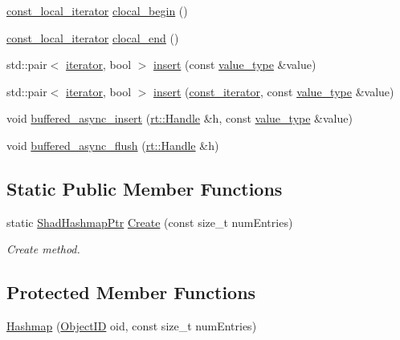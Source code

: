 \begin{DoxyCompactItemize}
\item 
\hyperlink{classshad_1_1Hashmap_afdf2dad495223a7d8bcec4256b591d89}{const\-\_\-local\-\_\-iterator} \hyperlink{classshad_1_1Hashmap_a04a14f79c423b6bef9fba77f642be9b6}{clocal\-\_\-begin} ()
\item 
\hyperlink{classshad_1_1Hashmap_afdf2dad495223a7d8bcec4256b591d89}{const\-\_\-local\-\_\-iterator} \hyperlink{classshad_1_1Hashmap_a41013ec16375b3de1af140c8f2e54627}{clocal\-\_\-end} ()
\item 
std\-::pair$<$ \hyperlink{classshad_1_1Hashmap_a2500b369fd011d6a9d5e98ff213c9c66}{iterator}, bool $>$ \hyperlink{classshad_1_1Hashmap_ab49d3f791ad9ba7af13349b2ae1a273f}{insert} (const \hyperlink{classshad_1_1Hashmap_ad8c0108347b59bcd19ccb8070a313dd8}{value\-\_\-type} \&value)
\item 
std\-::pair$<$ \hyperlink{classshad_1_1Hashmap_a2500b369fd011d6a9d5e98ff213c9c66}{iterator}, bool $>$ \hyperlink{classshad_1_1Hashmap_aea07d5e23d3978bb0858becef75dd24f}{insert} (\hyperlink{classshad_1_1Hashmap_a1f8a379c42bc2d4b67dcc9f519dc537e}{const\-\_\-iterator}, const \hyperlink{classshad_1_1Hashmap_ad8c0108347b59bcd19ccb8070a313dd8}{value\-\_\-type} \&value)
\item 
void \hyperlink{classshad_1_1Hashmap_ad47705f8fd28f908864edaf55ffe0713}{buffered\-\_\-async\-\_\-insert} (\hyperlink{classshad_1_1rt_1_1Handle}{rt\-::\-Handle} \&h, const \hyperlink{classshad_1_1Hashmap_ad8c0108347b59bcd19ccb8070a313dd8}{value\-\_\-type} \&value)
\item 
void \hyperlink{classshad_1_1Hashmap_adb0d51549addcbd2d2945198093765dc}{buffered\-\_\-async\-\_\-flush} (\hyperlink{classshad_1_1rt_1_1Handle}{rt\-::\-Handle} \&h)
\end{DoxyCompactItemize}
\subsection*{Static Public Member Functions}
\begin{DoxyCompactItemize}
\item 
static \hyperlink{classshad_1_1Hashmap_a5d013a5199b5745a1877b321af1b86ee}{Shad\-Hashmap\-Ptr} \hyperlink{classshad_1_1Hashmap_a304075c88faf0d3eff16c8a6b380138c}{Create} (const size\-\_\-t num\-Entries)
\begin{DoxyCompactList}\small\item\em Create method. \end{DoxyCompactList}\end{DoxyCompactItemize}
\subsection*{Protected Member Functions}
\begin{DoxyCompactItemize}
\item 
\hyperlink{classshad_1_1Hashmap_a8b729b8e8fe6186be91856998b29ef70}{Hashmap} (\hyperlink{classshad_1_1Hashmap_a1f10a3b0cce639008b5b9444eb167f8b}{Object\-I\-D} oid, const size\-\_\-t num\-Entries)
\end{DoxyCompactItemize}
